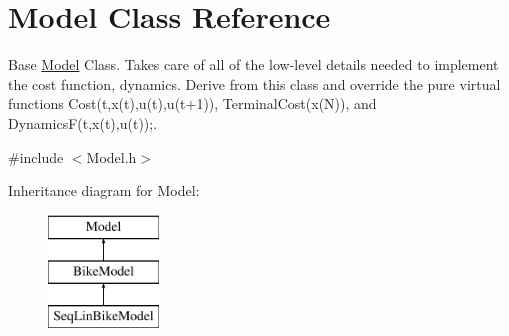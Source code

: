 \hypertarget{classModel}{}\section{Model Class Reference}
\label{classModel}


Base \mbox{\hyperlink{classModel}{Model}} Class. Takes care of all of the low-\/level details needed to implement the cost function, dynamics. Derive from this class and override the pure virtual functions Cost(t,x(t),u(t),u(t+1)), Terminal\+Cost(x(\+N)), and DynamicsF(t,x(t),u(t));.  




{\ttfamily \#include $<$Model.\+h$>$}

Inheritance diagram for Model\+:\begin{figure}[H]
\begin{center}
\leavevmode
\includegraphics[height=3.000000cm]{classModel}
\end{center}
\end{figure}
